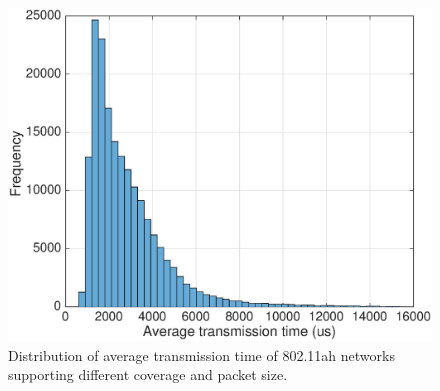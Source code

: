 % 







\begin{figure}[t]
  \centering
  \includegraphics[width=0.75\columnwidth]{figures/histTx}
  \caption{Distribution of average transmission time of 802.11ah networks supporting different coverage and packet size. \label{fig:tx-hist}}
\end{figure}


